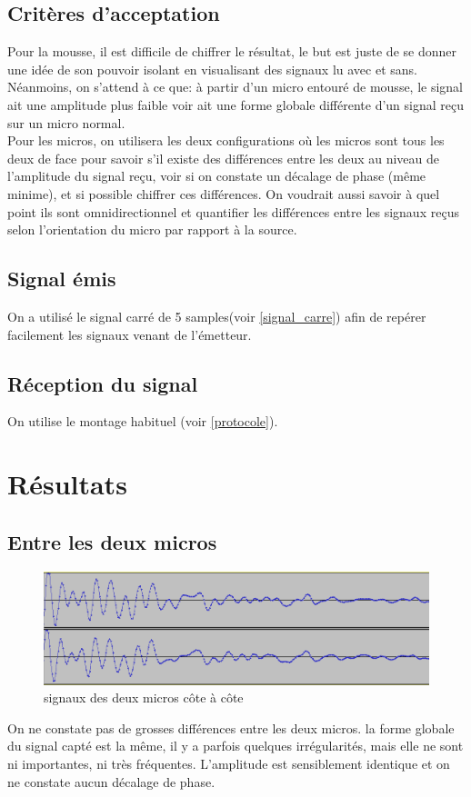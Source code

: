 \documentclass[12pt,a4paper]{report}
\begin{document}
\subsection{Critères d'acceptation}
Pour la mousse, il est difficile de chiffrer le résultat, le but est juste de se donner une idée de son pouvoir isolant en visualisant des signaux lu avec et sans. Néanmoins, on s'attend à ce que: à partir d'un micro entouré de mousse, le signal ait une amplitude plus faible voir ait une forme globale différente d'un signal reçu sur un micro normal.\\
Pour les micros, on utilisera les deux configurations où les micros sont tous les deux de face pour savoir s'il existe des différences entre les deux au niveau de l'amplitude du signal reçu, voir si on constate un décalage de phase (même minime), et si possible chiffrer ces différences. On voudrait aussi savoir à quel point ils sont omnidirectionnel et quantifier les différences entre les signaux reçus selon l'orientation du micro par rapport à la source.


\subsection{Signal émis}
On a utilisé le signal carré de 5 samples(voir \ref{signal_carre}) afin de repérer facilement les signaux venant de l'émetteur.

\subsection{Réception du signal}
On utilise le montage habituel (voir \ref{protocole}).

\section{Résultats}

\subsection{Entre les deux micros}\label{differences_entre_micros}

\begin{figure}[H]
\includegraphics[width=\textwidth]{img/micros_face.png}
\caption{signaux des deux micros côte à côte}
\end{figure}
On ne constate pas de grosses différences entre les deux micros. la forme globale du signal capté est la même, il y a parfois quelques irrégularités, mais elle ne sont ni importantes, ni très fréquentes. L'amplitude est sensiblement identique et on ne constate aucun décalage de phase.
\end{document}
